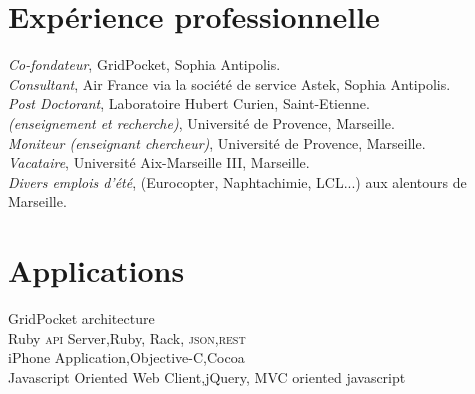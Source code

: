 
\newcommand{\short}{Short publications}


\reversemarginpar



\afficheContactInfos

\section*{Expérience professionnelle}

\noindent{}\emph{Co-fondateur}, GridPocket, Sophia Antipolis.\\
\noindent{}\emph{Consultant}, Air France via la société de service Astek, Sophia Antipolis.\\
\emph{Post Doctorant}, Laboratoire Hubert Curien, Saint-Etienne.\\
\emph{ {\footnotesize (enseignement et recherche)}}, Université de Provence, Marseille.\\
\emph{Moniteur (enseignant \amper{} chercheur)}, Université de Provence, Marseille.\\
\emph{Vacataire}, Université Aix-Marseille III, Marseille.\\
\emph{Divers emplois d'été}, {\footnotesize (Eurocopter, Naphtachimie, LCL...) } aux alentours de Marseille.

\section*{Applications}

GridPocket architecture\\
{\footnotesize \phantom{espace}Ruby \textsc{api} Server,\hfill Ruby, Rack, \textsc{json,rest}}\\
{\footnotesize \phantom{espace}iPhone Application,\hfill Objective-C,Cocoa }\\
{\footnotesize \phantom{espace}Javascript Oriented Web Client,\hfill jQuery, MVC oriented javascript}\\

